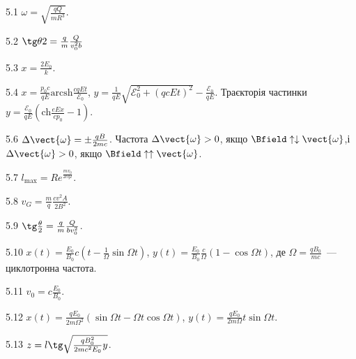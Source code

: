 \protect \section *{}
\begin{Solution}{5.{1}}
	$\omega = \sqrt{\frac{qQ}{mR^3}}$.
\end{Solution}
\begin{Solution}{5.{2}}
	$\tg\theta2 = \frac qm\frac{Q}{v_0^2b}$
\end{Solution}
\begin{Solution}{5.{3}}
	$x = \frac{2E_0}{k}$.
\end{Solution}
\begin{Solution}{5.{4}}
	$x = \frac{p_0c}{qE} \mathrm{arcsh}\frac{cqEt}{\mathcal{E}_0}$, $y = \frac{1}{qE}\sqrt{\mathcal{E}_0^2 + (qcEt)^2} - \frac{\mathcal{E}_0}{qE}$. Траєкторія частинки $y = \frac{\mathcal{E}_0}{qE} \left( \mathrm{ch}\frac{eEx}{cp_0} - 1\right) $.
\end{Solution}
\begin{Solution}{5.{6}}
	$\Delta\vect{\omega} = \pm\frac{qB}{2mc}$. Частота $\Delta\vect{\omega}>0$, якщо $\Bfield \uparrow\downarrow \vect{\omega}$,і
	$\Delta\vect{\omega}>0$, якщо $\Bfield \uparrow\uparrow \vect{\omega}$.
\end{Solution}
\begin{Solution}{5.{7}}
	$l_{\max} = Re^{\frac{mv_0}{2cqI}}$.
\end{Solution}
\begin{Solution}{5.{8}}
	$v_G = \frac{m}{q}\frac{cv^2A}{2B^2}.$
\end{Solution}
\begin{Solution}{5.{9}}
	$\tg\frac{\theta}{2} = \frac qm \frac{Q}{bv_0^2}$.
\end{Solution}
\begin{Solution}{5.{10}}
	$x(t)  = \frac{E_0}{B_0}c\left( t - \frac{1}{\Omega}\sin\Omega t \right) $,
	$y(t)  = \frac{E_0}{B_0} \frac{c}{\Omega}\left( 1 - \cos\Omega t \right) $, де $\Omega = \frac{qB_0}{mc}$~--- циклотронна частота.
\end{Solution}
\begin{Solution}{5.{11}}
	$v_0 = c\frac{E_0}{B_0}$.
\end{Solution}
\begin{Solution}{5.{12}}
	$x(t)  = \frac{qE_0}{2m\Omega^2}\left( \sin\Omega t - \Omega t\cos\Omega t \right) $,
	$y(t)  = \frac{qE_0}{2m\Omega}t\sin\Omega t$.
\end{Solution}
\begin{Solution}{5.{13}}
	$z = l\tg\sqrt{\frac{qB_0^2}{2mc^2E_0}y}$.
\end{Solution}
